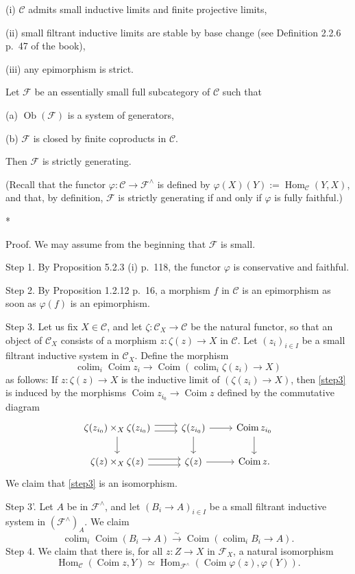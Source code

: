 \documentclass[12pt]{article}
\theoremstyle{remark}
\theoremstyle{definition}
\newcommand{\C}{\mathcal C}
\newcommand{\F}{\mathcal F}
\DeclareMathOperator*{\coli}{colim}
\DeclareMathOperator{\Coim}{Coim}
\DeclareMathOperator{\Hom}{Hom}%
\DeclareMathOperator{\Ob}{Ob}
\begin{document}
\noindent (i) $\C$ admits small inductive limits and finite projective limits, 

\noindent (ii) small filtrant inductive limits are stable by base change (see Definition 2.2.6 p.~47 of the book), 

\noindent (iii) any epimorphism is strict.

\noindent Let $\F$ be an essentially small full subcategory of $\C$ such that 

\noindent (a) $\Ob(\F)$ is a system of generators,

\noindent (b) $\F$ is closed by finite coproducts in $\C$. 

\noindent Then $\F$ is strictly generating.

(Recall that the functor $\varphi:\C\to\F^\wedge$ is defined by $\varphi(X)(Y):=\Hom_\C(Y,X)$, and that, by definition, $\F$ is strictly generating if and only if $\varphi$ is fully faithful.)
%
\begin{center}*\end{center}
%
Proof. We may assume from the beginning that $\F$ is small.

\noindent Step 1. By Proposition 5.2.3 (i) p.~118, the functor $\varphi$ is conservative and faithful.

\noindent Step 2. By Proposition 1.2.12 p.~16, a morphism $f$ in $\C$ is an epimorphism as soon as $\varphi(f)$ is an epimorphism.

\noindent Step 3. Let us fix $X\in\C$, and let $\zeta:\C_X\to\C$ be the natural functor, so that an object of $\C_X$ consists of a morphism $z:\zeta(z)\to X$ in $\C$. Let $(z_i)_{i\in I}$ be a small filtrant inductive system in $\C_X$. Define the morphism
% 
\begin{equation}\label{step3}
\coli_i\Coim z_i\to\Coim\left(\coli_i\zeta(z_i)\to X\right)
\end{equation}
%
as follows: If $z:\zeta(z)\to X$ is the inductive limit of $(\zeta(z_i)\to X)$, then \eqref{step3} is induced by the morphisms $\Coim z_{i_0}\to\Coim z$ defined by the commutative diagram 
$$
\begin{tikzcd}
\zeta(z_{i_0})\times_X\zeta(z_{i_0})\ar{d}\ar[yshift=0.7ex]{r}\ar[yshift=-0.7ex]{r}&\zeta(z_{i_0})\ar{d}\ar{r}&\Coim z_{i_0}\ar{d}\\ 
\zeta(z)\times_X\zeta(z)\ar[yshift=0.7ex]{r}\ar[yshift=-0.7ex]{r}&\zeta(z)\ar{r}&\Coim z.
\end{tikzcd}
$$ 
We claim that \eqref{step3} is an isomorphism.

\noindent Step 3'. Let $A$ be in $\F^\wedge$, and let $(B_i\to A)_{i\in I}$ be a small filtrant inductive system in $(\F^\wedge)_A$. We claim 
$$
\coli_i\Coim(B_i\to A)\xrightarrow{\sim}
\Coim\left(\coli_iB_i\to A\right).
$$
Step 4. We claim that there is, for all $z:Z\to X$ in $\F_X$, a natural isomorphism 
$$
\Hom_\C(\Coim z,Y)\simeq\Hom_{\F^\wedge}(\Coim\varphi(z),\varphi(Y)).
$$ 
\end{document}
